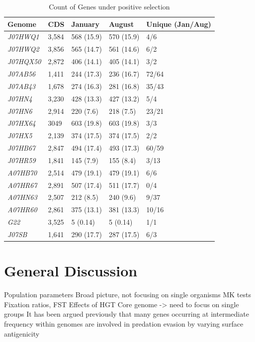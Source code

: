 \begin{table}[hbt]
  \caption{Count of Genes under positive selection}
  \begin{tabularx}{\textwidth}{L{2.2cm}R{2cm}R{3cm}R{3.2cm}R{2cm}}
  \hline
    \textbf{Genome} & \textbf{CDS} & \textbf{January} & \textbf{August} & \textbf{Unique (Jan/Aug)} \\
    \hline
     \textit{J07HWQ1} & 3,584 & 568 (15.9) & 570 (15.9) & 4/6 \\
     \textit{J07HWQ2} & 3,856 & 565 (14.7) & 561 (14.6) & 6/2 \\
     \textit{J07HQX50} & 2,872 & 406 (14.1) & 405 (14.1) & 3/2 \\
     \textit{J07AB56} & 1,411 & 244 (17.3) & 236 (16.7) & 72/64 \\
     \textit{J07AB43} & 1,678 & 274 (16.3) & 281 (16.8) & 35/43 \\
     \textit{J07HN4} & 3,230 & 428 (13.3) & 427 (13.2) & 5/4 \\
     \textit{J07HN6} & 2,914 & 220 (7.6) & 218 (7.5) & 23/21 \\
     \textit{J07HX64} & 3049 & 603 (19.8) & 603 (19.8) & 3/3 \\
     \textit{J07HX5} & 2,139 & 374 (17.5) & 374 (17.5) & 2/2 \\
     \textit{J07HB67} & 2,847 & 494 (17.4) & 493 (17.3) & 60/59 \\
     \textit{J07HR59} & 1,841 & 145 (7.9) & 155 (8.4) & 3/13 \\
     \textit{A07HB70} & 2,514 & 479 (19.1) & 479 (19.1) & 6/6 \\
     \textit{A07HR67} & 2,891 & 507 (17.4) & 511 (17.7) & 0/4 \\
     \textit{A07HN63} & 2,507 & 212 (8.5) & 240 (9.6) & 9/37 \\
     \textit{A07HR60} & 2,861 & 375 (13.1) & 381 (13.3) & 10/16 \\
     \textit{G22} & 3,525 & 5 (0.14) & 5 (0.14) & 1/1 \\
     \textit{J07SB} & 1,641 & 290 (17.7) & 287 (17.5) & 6/3 \\     
  \end{tabularx}
  \label{PSgenes}
\end{table}



\clearpage
\section{General Discussion}
Population parameters
Broad picture, not focusing on single organisms
MK tests
Fixation ratios, FST
Effects of HGT
Core genome -> need to focus on single groups
It has been argued previously that many genes occurring at intermediate frequency within genomes are involved in predation evasion by varying surface antigenicity 



